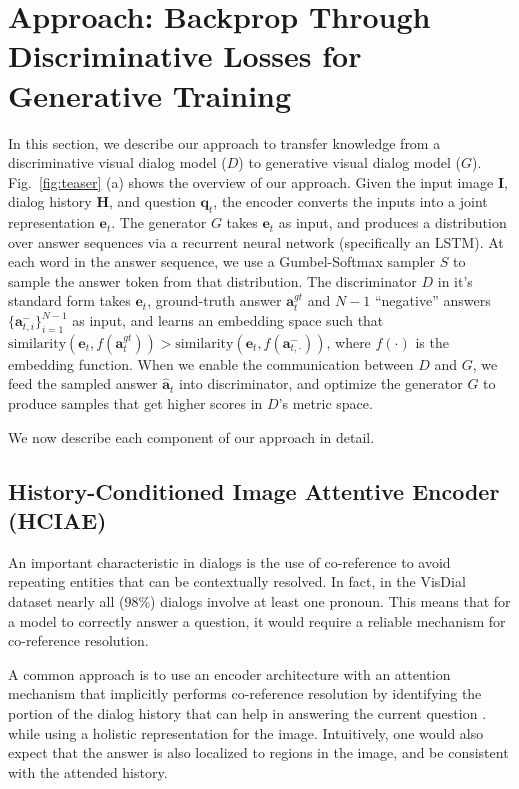 \documentclass{article}
\newcommand{\vd}{VisDial\xspace}
\newcommand{\ourenc}{HCIAE\xspace}
\begin{document}
\section{Approach: Backprop Through Discriminative Losses for Generative Training}
\vspace{-1mm}
In this section, we describe our approach to transfer knowledge from a discriminative visual dialog model ($D$) 
to generative visual dialog model ($G$).  
Fig.~\ref{fig:teaser} (a) shows the overview of our approach.  
Given the input image $\bm{I}$, dialog history $\bm{H}$, and question $\bm{q}_t$, the encoder converts the inputs into a joint representation 
$\bm{e}_t$. 
The generator $G$ takes $\bm{e}_t$ as input, and produces a distribution over answer sequences via a recurrent 
neural network (specifically an LSTM).  
At each word in the answer sequence, we use a Gumbel-Softmax sampler $S$ to sample the answer token from that distribution. 
The discriminator $D$ in it's standard form takes $\bm{e}_t$, ground-truth answer $\bm{a}_t^{gt}$ and $N-1$ ``negative'' answers 
$\{\bm{a}^-_{t,i}\}_{i=1}^{N-1}$ as input, and learns an embedding space such that 
$\text{similarity}(\bm{e}_t, f(\bm{a}^{gt}_t)) > \text{similarity}(\bm{e}_t, f(\bm{a}^-_{t,\cdot}))$, 
where $f(\cdot)$ is the embedding function. 
When we enable the communication between $D$ and $G$, 
we feed the sampled answer $\bm{\hat{a}}_t$ into discriminator, 
and optimize the generator $G$ to produce samples that get higher scores in $D$'s metric space. 

We now describe each component of our approach in detail. 

\subsection{History-Conditioned Image Attentive Encoder (\ourenc)}
\label{sec:encoder}

An important characteristic in dialogs is the use of co-reference to avoid repeating entities that can be contextually resolved. In fact, in the 
\vd dataset \cite{visdial} nearly all (98\%) dialogs involve at least one pronoun. 
This means that for a model to correctly answer a question, it would require a reliable mechanism for co-reference resolution. 

A common approach is to use an encoder architecture with an attention mechanism that implicitly performs co-reference resolution 
by identifying the portion of the dialog history that can help in answering the current question \cite{visdial, serban2015building, serban2016hierarchical, mei2016coherent}. 
while using a holistic representation for the image. Intuitively, one would also expect that the answer is also localized to regions in the image, and be consistent with the attended history. 
\end{document}

